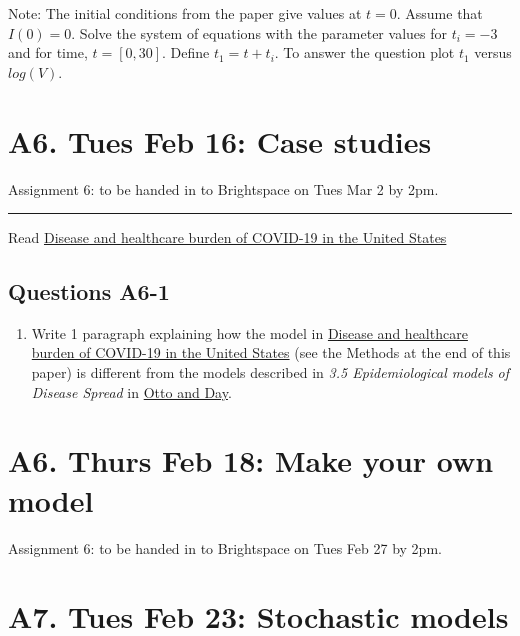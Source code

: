 \documentclass[]{book}
\providecommand{\tightlist}{%
  \setlength{\itemsep}{0pt}\setlength{\parskip}{0pt}}
\begin{document}
Note: The initial conditions from the paper give values at \(t=0\).
Assume that \(I(0)=0\). Solve the system of equations with the parameter
values for \(t_i = -3\) and for time, \(t = [0, 30]\). Define
\(t_1 = t + t_i\). To answer the question plot \(t_1\) versus
\(log(V)\).

\chapter{A6. Tues Feb 16: Case
studies}\label{a6.-tues-feb-16-case-studies}

Assignment 6: to be handed in to Brightspace on Tues Mar 2 by 2pm.

\begin{center}\rule{0.5\linewidth}{0.5pt}\end{center}

Read
\href{https://www-nature-com.qe2a-proxy.mun.ca/articles/s41591-020-0952-y}{Disease
and healthcare burden of COVID-19 in the United States}

\section*{Questions A6-1}\label{questions-a6-1}

\begin{enumerate}
\def\labelenumi{\arabic{enumi}.}
\tightlist
\item
  Write 1 paragraph explaining how the model in
  \href{https://www-nature-com.qe2a-proxy.mun.ca/articles/s41591-020-0952-y}{Disease
  and healthcare burden of COVID-19 in the United States} (see the
  Methods at the end of this paper) is different from the models
  described in \emph{3.5 Epidemiological models of Disease Spread} in
  \href{https://ebookcentral-proquest-com.qe2a-proxy.mun.ca/lib/mun/reader.action?docID=768551\&ppg=93}{Otto
  and Day}.
\end{enumerate}

\chapter{A6. Thurs Feb 18: Make your own
model}\label{a6.-thurs-feb-18-make-your-own-model}

Assignment 6: to be handed in to Brightspace on Tues Feb 27 by 2pm.

\chapter{A7. Tues Feb 23: Stochastic
models}\label{a7.-tues-feb-23-stochastic-models}
\end{document}
